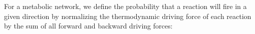 For a metabolic network, we define the probability that a reaction will fire in a given direction by normalizing the thermodynamic driving force of each reaction by the sum of all forward and backward driving forces: